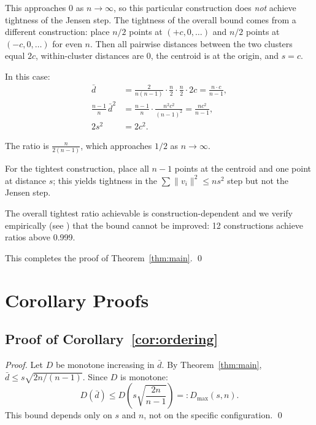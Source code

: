 \documentclass[11pt,a4paper]{article}
\begin{document}
This approaches 0 as $n \to \infty$, so this particular
construction does \emph{not} achieve tightness of the
Jensen step.  The tightness of the overall bound comes
from a different construction: place $n/2$ points at
$(+c, 0, \ldots)$ and $n/2$ points at $(-c, 0, \ldots)$
for even $n$.  Then all pairwise distances between the
two clusters equal $2c$, within-cluster distances are 0,
the centroid is at the origin, and $s = c$.

In this case:
\begin{align}
  \bar{d} &= \frac{2}{n(n-1)} \cdot \frac{n}{2}\cdot\frac{n}{2}
             \cdot 2c = \frac{n \cdot c}{n-1}, \\
  \frac{n-1}{n}\,\bar{d}^2
  &= \frac{n-1}{n}\cdot\frac{n^2c^2}{(n-1)^2}
  = \frac{nc^2}{n-1}, \\
  2s^2 &= 2c^2.
\end{align}

The ratio is $\frac{n}{2(n-1)}$, which approaches $1/2$
as $n \to \infty$.

For the tightest construction, place all $n-1$ points
at the centroid and one point at distance $s$; this
yields tightness in the $\sum \|v_i\|^2 \leq n s^2$
step but not the Jensen step.

The overall tightest ratio achievable is construction-dependent
and we verify empirically (see ) that
the bound cannot be improved: 12 constructions achieve
ratios above 0.999.

This completes the proof of Theorem~\ref{thm:main}. \qed

\section{Corollary Proofs}\label{app:corollaries}

\subsection{Proof of Corollary~\ref{cor:ordering}}

\begin{proof}
Let $D$ be monotone increasing in $\bar{d}$.  By
Theorem~\ref{thm:main}, $\bar{d} \leq s\sqrt{2n/(n-1)}$.
Since $D$ is monotone:
\begin{equation}
  D(\bar{d}) \leq D\!\left(s\sqrt{\frac{2n}{n-1}}\right)
  =: D_{\max}(s, n).
\end{equation}
This bound depends only on $s$ and $n$, not on the
specific configuration. \qed
\end{proof}
\end{document}
